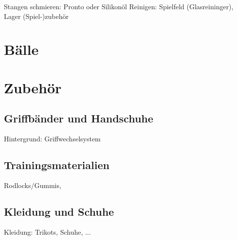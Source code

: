 Stangen schmieren: Pronto oder Silikonöl
Reinigen: Spielfeld (Glasreininger), Lager
(Spiel-)zubehör 

\section{Bälle}
\label{tisch:baelle}



\section{Zubehör}
\label{tisch:zubehoer}


\subsection{Griffbänder und Handschuhe}
\label{tisch:zubehoer:griffe}



Hintergrund: Griffwechselsystem

\subsection{Trainingsmaterialien}
\label{tisch:zubehoer:training}
Rodlocks/Gummis,  

\subsection{Kleidung und Schuhe}
\label{tisch:zubehoer:kleidung}
Kleidung: Trikots, Schuhe, ...
